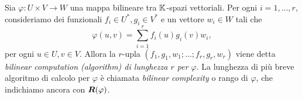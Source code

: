 \begin{definition}
	Sia $ \varphi : U \times V \to  W $ una mappa bilineare tra $ \mathbb{K} $-spazi vettoriali. Per ogni $ i
		= 1, \dots, r $, consideriamo dei funzionali $ f_{i} \in U^*, g_{i} \in V^*$ e un vettore $ w_{i} \in W$ tali che
	\begin{equation*}
		\varphi(u,v) = \sum_{i=1}^r f_{i}(u)g_{i}(v)w_{i},
	\end{equation*}
	per ogni $ u \in U, v \in V$. Allora la $ r $-upla $ (f_1,g_1,w_1; \ldots ; f_r, g_r,w_r) $ viene
	detta \emph{bilinear computation (algorithm) di lunghezza $ r $ per $ \varphi $}. La lunghezza
	di più breve algoritmo di calcolo per $ \varphi $ è chiamata \emph{bilinear complexity} o rango
	di $ \varphi $, che indichiamo ancora con $ \bm{R}(\varphi) $.
\end{definition}



